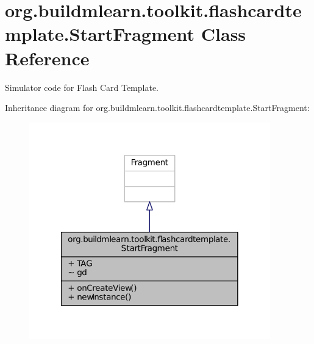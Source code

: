 \hypertarget{classorg_1_1buildmlearn_1_1toolkit_1_1flashcardtemplate_1_1StartFragment}{\section{org.\-buildmlearn.\-toolkit.\-flashcardtemplate.\-Start\-Fragment Class Reference}
\label{classorg_1_1buildmlearn_1_1toolkit_1_1flashcardtemplate_1_1StartFragment}
}


Simulator code for Flash Card Template.  




Inheritance diagram for org.\-buildmlearn.\-toolkit.\-flashcardtemplate.\-Start\-Fragment\-:
\nopagebreak
\begin{figure}[H]
\begin{center}
\leavevmode
\includegraphics[width=296pt]{d4/d84/classorg_1_1buildmlearn_1_1toolkit_1_1flashcardtemplate_1_1StartFragment__inherit__graph}
\end{center}
\end{figure}


